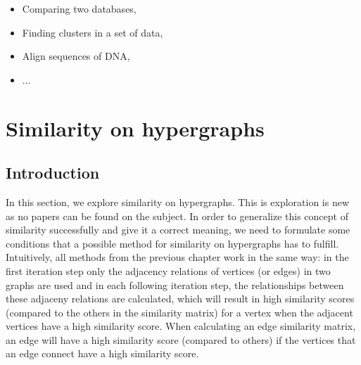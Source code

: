 \documentclass[a4paper,11pt]{report}
\begin{document}
\begin{itemize}
  \item Comparing two databases,
  \item Finding clusters in a set of data,
  \item Align sequences of DNA,
  \item ...
  
\end{itemize}



\chapter{Similarity on hypergraphs}
\section{Introduction}
In this section, we explore similarity on hypergraphs. This is exploration is new as no papers can be found on the subject. In order to generalize
this concept of similarity successfully and give it a correct meaning, we need to formulate 
some conditions that a possible method for similarity on hypergraphs has to fulfill. 
Intuitively, all methods from the previous chapter work in the same way: in the 
first iteration step only the adjacency relations of vertices (or edges) in two graphs are 
used and in each following iteration step, the relationships between these 
adjaceny relations are calculated, which will result in high similarity scores (compared to the others in the similarity matrix)
for a vertex when the adjacent vertices have a high similarity score. When calculating an edge similarity matrix,
an edge will have a high similarity score (compared to others) if the vertices that an edge connect have a high similarity score.
 
\end{document}
